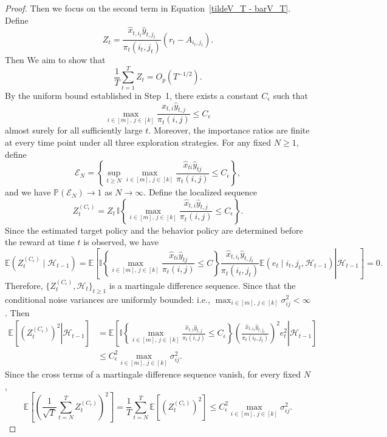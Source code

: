 \documentclass[12pt]{article}
\begin{document}
\begin{proof}
Then we focus on the second term in Equation~\eqref{tildeV_T - barV_T}. Define 
\[
Z_t = \frac{ \widehat{x}_{t,i_t}\widehat{y}_{t,j_t} }{ \pi_t(i_t,j_t) } \left( r_t-A_{i_t,j_t} \right). 
\] 
Then We aim to show that 
\[ 
\frac{1}{T}\sum_{t=1}^T Z_t = O_p(T^{-1/2}). 
\] 
By the uniform bound established in Step~1, there exists a constant $C_\epsilon$ such that 
\[ 
\max_{i\in[m],\,j\in[k]} \frac{ \widehat{x}_{t,i}\widehat{y}_{t,j} }{ \pi_t(i,j) }\le C_\epsilon 
\] 
almost surely for all sufficiently large $t$. Moreover, the importance ratios are finite at every time point under all three exploration strategies. For any fixed $N\ge1$, define 
\[ 
\mathcal E_N = \left\{ \sup_{t\ge N}\max_{i\in[m],\,j\in[k]} \frac{ \widehat{x}_{ti}\widehat{y}_{tj} }{ \pi_t(i,j) }\le C_\epsilon \right\},
\] 
and we have $\mathbb P(\mathcal E_N)\to 1$ as $N\to\infty$. Define the localized sequence 
\[ 
Z_t^{(C_\epsilon)} = Z_t \, \mathbb I \left\{\max_{i\in[m],\,j\in[k]} \frac{ \widehat{x}_{t,i}\widehat{y}_{t,j} }{ \pi_t(i,j) }\le C_\epsilon \right\}. 
\] 
Since the estimated target policy and the behavior policy are determined before the reward at time $t$ is observed, we have 
\[
\mathbb E\left( Z_t^{(C_\epsilon)} \mid \mathcal H_{t-1} \right) = \mathbb E\left[ \left. \mathbb I \left\{\max_{i\in[m],\,j\in[k]} \frac{ \widehat{x}_{ti}\widehat{y}_{tj} }{ \pi_t(i,j) }\le C\right\} \frac{ \widehat{x}_{t,i_t}\widehat{y}_{t,j_t} }{ \pi_t(i_t,j_t) } \mathbb E\left( e_t \mid i_t,j_t,\mathcal H_{t-1} \right) \right| \mathcal H_{t-1} \right] =0. 
\]
Therefore, $\{Z_t^{(C_\epsilon)},\mathcal H_t\}_{t\ge1}$ is a martingale difference sequence. 
Since that the conditional noise variances are uniformly bounded: i.e., $\max_{i\in[m],\,j\in[k]} \sigma_{ij}^2 < \infty$. Then 
\begin{align*} 
\mathbb E\left[ \left. \left( Z_t^{(C_\epsilon)} \right)^2 \right| \mathcal H_{t-1} \right] 
&= \mathbb E\left[ \left. \mathbb I \left\{\max_{i\in[m],\,j\in[k]} \frac{ \widehat{x}_{t,i}\widehat{y}_{t,j} }{ \pi_t(i,j) }\le C_\epsilon\right\} \left( \frac{ \widehat{x}_{t,i_t}\widehat{y}_{t,j_t} }{ \pi_t(i_t,j_t) } \right)^2 e_t^2 \right| \mathcal H_{t-1} \right] \\ 
&\le C_\epsilon^2 \max_{i\in[m],\,j\in[k]} \sigma_{ij}^2. 
\end{align*} 
Since the cross terms of a martingale difference sequence vanish, for every fixed $N$, 
\[
\mathbb E\left[ \left( \frac{1}{\sqrt{T}} \sum_{t=N}^T Z_t^{(C_\epsilon)} \right)^2 \right] = \frac{1}{T} \sum_{t=N}^T \mathbb E\left[ \left( Z_t^{(C_\epsilon)} \right)^2 \right] \le C_\epsilon^2 \max_{i\in[m],\,j\in[k]} \sigma_{ij}^2. 
\]
\end{proof}
\end{document}
